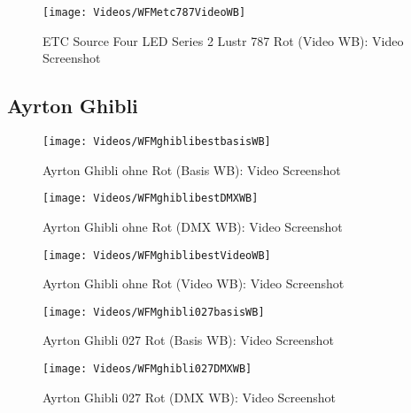 \documentclass[pagesize,paper=A4,fontsize=12pt,utf8,numbers=noenddot,bibliography=totoc,listof=totoc,DIV=11,BCOR=1mm]{scrreprt}
\begin{document}
\begin{figure}[htp]     %
\centering
\texttt{[image: Videos/WFMetc787VideoWB]} 
\caption {ETC Source Four LED Series 2 Lustr 787 Rot (Video WB): Video Screenshot} 
\end{figure}



\subsection{Ayrton Ghibli}

\begin{figure}[htp]     %
\centering
\texttt{[image: Videos/WFMghiblibestbasisWB]} 
\caption {Ayrton Ghibli ohne Rot (Basis WB): Video Screenshot} 
\end{figure}

\begin{figure}[htp]     %
\centering
\texttt{[image: Videos/WFMghiblibestDMXWB]} 
\caption {Ayrton Ghibli ohne Rot (DMX WB): Video Screenshot} 
\end{figure}

\begin{figure}[htp]     %
\centering
\texttt{[image: Videos/WFMghiblibestVideoWB]} 
\caption {Ayrton Ghibli ohne Rot (Video WB): Video Screenshot} 
\end{figure}



\begin{figure}[htp]     %
\centering
\texttt{[image: Videos/WFMghibli027basisWB]} 
\caption {Ayrton Ghibli 027 Rot (Basis WB): Video Screenshot} 
\end{figure}

\begin{figure}[htp]     %
\centering
\texttt{[image: Videos/WFMghibli027DMXWB]} 
\caption {Ayrton Ghibli 027 Rot (DMX WB): Video Screenshot} 
\end{figure}
\end{document}
